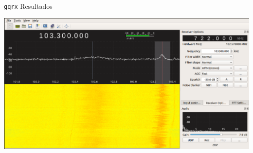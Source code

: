 \begin{frame}{{\tt gqrx} Resultados}

\begin{center}
\vspace{-0.3cm}
\includegraphics[width=.8\textwidth]{parte2/lab6/pdf/lab6_p_8.pdf}
\end{center}

\end{frame}



